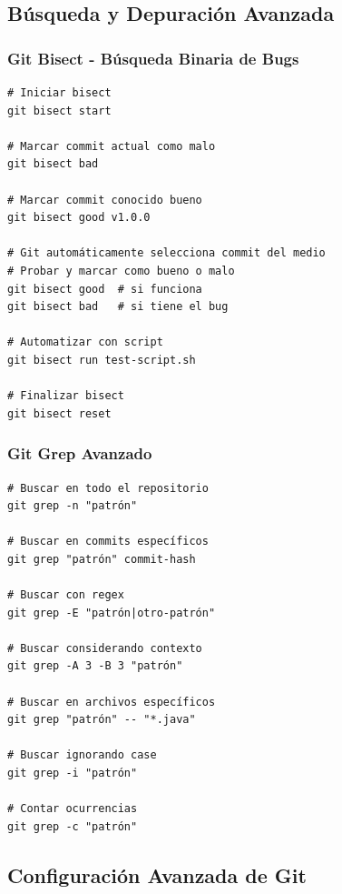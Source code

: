\documentclass[12pt,a4paper]{article}
\begin{document}
\subsection{Búsqueda y Depuración Avanzada}

\subsubsection{Git Bisect - Búsqueda Binaria de Bugs}
\begin{lstlisting}[caption=Encontrar bugs con bisect]
# Iniciar bisect
git bisect start

# Marcar commit actual como malo
git bisect bad

# Marcar commit conocido bueno
git bisect good v1.0.0

# Git automáticamente selecciona commit del medio
# Probar y marcar como bueno o malo
git bisect good  # si funciona
git bisect bad   # si tiene el bug

# Automatizar con script
git bisect run test-script.sh

# Finalizar bisect
git bisect reset
\end{lstlisting}

\subsubsection{Git Grep Avanzado}
\begin{lstlisting}[caption=Búsqueda avanzada en historial]
# Buscar en todo el repositorio
git grep -n "patrón"

# Buscar en commits específicos
git grep "patrón" commit-hash

# Buscar con regex
git grep -E "patrón|otro-patrón"

# Buscar considerando contexto
git grep -A 3 -B 3 "patrón"

# Buscar en archivos específicos
git grep "patrón" -- "*.java"

# Buscar ignorando case
git grep -i "patrón"

# Contar ocurrencias
git grep -c "patrón"
\end{lstlisting}

\subsection{Configuración Avanzada de Git}
\end{document}
